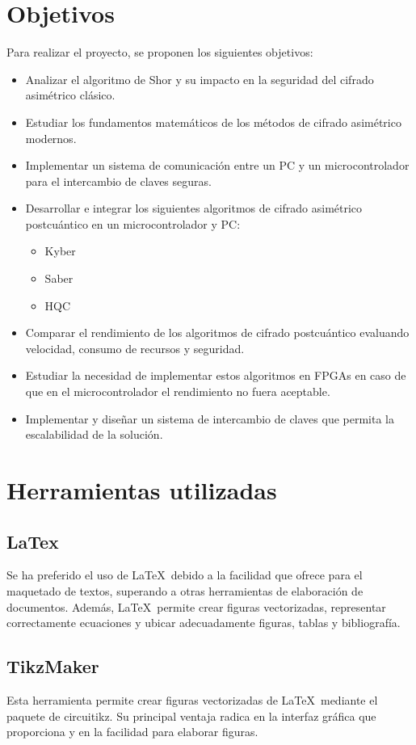 \section{Objetivos}
Para realizar el proyecto, se proponen los siguientes objetivos:
\begin{itemize}
\item Analizar el algoritmo de Shor y su impacto en la seguridad del cifrado asimétrico clásico.
\item Estudiar los fundamentos matemáticos de los métodos de cifrado asimétrico modernos.
\item Implementar un sistema de comunicación entre un PC y un microcontrolador para el intercambio de claves seguras.
\item  Desarrollar e integrar los siguientes algoritmos de cifrado asimétrico postcuántico en un microcontrolador y PC:
\begin{itemize}
	\item Kyber
	\item Saber
	\item HQC
\end{itemize}
\item Comparar el rendimiento de los algoritmos de cifrado postcuántico evaluando velocidad, consumo de recursos y seguridad.
\item Estudiar la necesidad de implementar estos algoritmos en FPGAs en caso de que en el microcontrolador el rendimiento no fuera aceptable.
\item Implementar y diseñar un sistema de intercambio de claves que permita la escalabilidad de la solución.
\end{itemize}


\section{Herramientas utilizadas}
\subsection{LaTex} 
Se ha preferido el uso de \LaTeX\ debido a la facilidad que ofrece para el maquetado de textos, superando a otras herramientas de elaboración de documentos. Además, \LaTeX\ permite crear figuras vectorizadas, representar correctamente ecuaciones y ubicar adecuadamente figuras, tablas y bibliografía.
\subsection{TikzMaker} 
Esta herramienta \cite{tikzmaker} permite crear figuras vectorizadas de \LaTeX\ mediante el paquete de circuitikz. Su principal ventaja radica en la interfaz gráfica que proporciona y en la facilidad para elaborar figuras.

